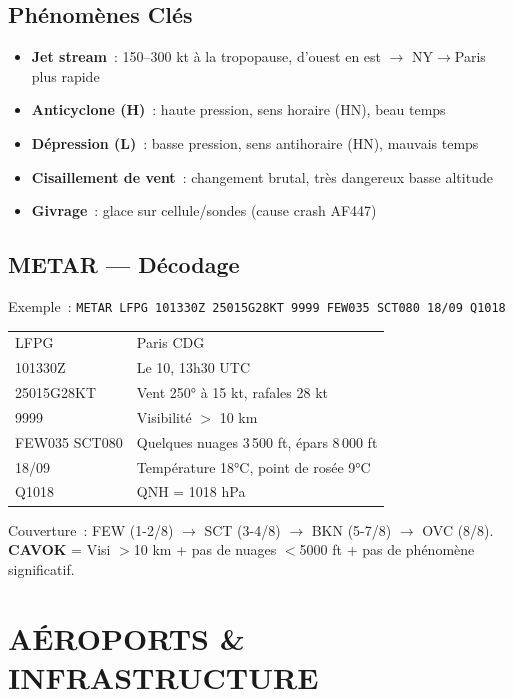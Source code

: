 \documentclass[11pt,a4paper]{article}
\begin{document}
\subsection{Phénomènes Clés}

\begin{itemize}[nosep]
\item \textbf{Jet stream}~: 150--300 kt à la tropopause, d'ouest en est $\to$ NY$\to$Paris plus rapide
\item \textbf{Anticyclone (H)}~: haute pression, sens horaire (HN), beau temps
\item \textbf{Dépression (L)}~: basse pression, sens antihoraire (HN), mauvais temps
\item \textbf{Cisaillement de vent}~: changement brutal, très dangereux basse altitude
\item \textbf{Givrage}~: glace sur cellule/sondes (cause crash AF447)
\end{itemize}

\subsection{METAR --- Décodage}

Exemple~: \texttt{METAR LFPG 101330Z 25015G28KT 9999 FEW035 SCT080 18/09 Q1018}

\begin{tabular}{p{3cm}p{11.5cm}}
\toprule
LFPG & Paris CDG \\
101330Z & Le 10, 13h30 UTC \\
25015G28KT & Vent 250° à 15 kt, rafales 28 kt \\
9999 & Visibilité $>$ 10 km \\
FEW035 SCT080 & Quelques nuages 3\,500 ft, épars 8\,000 ft \\
18/09 & Température 18°C, point de rosée 9°C \\
Q1018 & QNH = 1018 hPa \\
\bottomrule
\end{tabular}

\begin{memobox}
Couverture~: FEW (1-2/8) $\to$ SCT (3-4/8) $\to$ BKN (5-7/8) $\to$ OVC (8/8).\\
\textbf{CAVOK} = Visi $>$10 km + pas de nuages $<$5000 ft + pas de phénomène significatif.
\end{memobox}

\newpage
\section{AÉROPORTS \& INFRASTRUCTURE}
\end{document}
